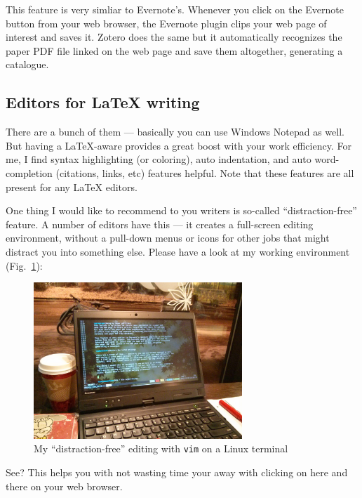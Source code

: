 \documentclass[11pt]{article}
\begin{document}
This feature is very simliar to Evernote's. Whenever you click on the Evernote
button from your web browser, the Evernote plugin clips your web page of
interest and saves it. Zotero does the same but it automatically recognizes
the paper PDF file linked on the web page and save them altogether, 
generating a catalogue.

\subsection{Editors for LaTeX writing}

There are a bunch of them --- basically you can use Windows Notepad as well.
But having a LaTeX-aware provides a great boost with your work efficiency. For
me, I find syntax highlighting (or coloring), auto indentation, and auto
word-completion (citations, links, etc)  features helpful. Note that these
features are all present for any LaTeX editors.

One thing I would like to recommend to you writers is so-called
``distraction-free'' feature. A number of editors have this --- it creates a
full-screen editing environment, without a pull-down menus or icons for other
jobs that might distract you into something else. Please have a look at my
working environment (Fig.~\ref{fig:distraction-free}):

\begin{figure}[h]
    \begin{center}
        \includegraphics[width=0.7\textwidth]{figure/distract-free-shot}
    \end{center}
    \caption{My ``distraction-free'' editing with \texttt{vim} on a Linux
        terminal}
    \label{fig:distraction-free}
\end{figure}

See? This helps you with not wasting time your away with clicking on here and
there on your web browser. 
\end{document}
